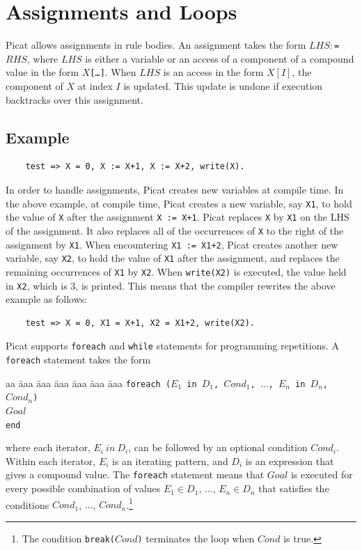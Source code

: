 \section{Assignments and Loops}
Picat allows assignments in rule bodies. An assignment takes the form $LHS $$:$\verb+=+$ RHS$, where $LHS$ is either a variable or an access of a component of a compound value in the form \texttt{$X$[\ldots]}. When $LHS$ is an access in the form $X[I]$, the component of $X$ at index $I$ is updated. This update is undone if execution backtracks over this assignment.

\subsection*{Example}
\begin{verbatim}
    test => X = 0, X := X+1, X := X+2, write(X).
\end{verbatim}

In order to handle assignments, Picat creates new variables at compile time.  In the above example, at compile time, Picat creates a new variable, say \texttt{X1}, to hold the value of \texttt{X} after the assignment \verb-X := X+1-. Picat replaces \texttt{X} by \texttt{X1} on the LHS of the assignment.  It also replaces all of the occurrences of \texttt{X} to the right of the assignment by \texttt{X1}.  When encountering \verb-X1 := X1+2-, Picat creates another new variable, say \texttt{X2}, to hold the value of \texttt{X1} after the assignment, and replaces the remaining occurrences of \texttt{X1} by \texttt{X2}. When \texttt{write(X2)} is executed, the value held in \texttt{X2}, which is 3, is printed.  This means that the compiler rewrites the above example as follows:
\begin{verbatim}
    test => X = 0, X1 = X+1, X2 = X1+2, write(X2).
\end{verbatim}

Picat supports \texttt{foreach} and \texttt{while} statements for programming repetitions. A \texttt{foreach} statement takes the form
\begin{tabbing}
aa \= aaa \= aaa \= aaa \= aaa \= aaa \= aaa \kill
\> \texttt{foreach ($E_1$ in $D_1$, $Cond_1$, $\ldots$, $E_n$ in $D_n$, $Cond_n$)}  \\
\> \> $Goal$ \\
\>  \texttt{end} 
\end{tabbing}
where each iterator, $E_i\ in\ D_i$, can be followed by an optional condition $Cond_i$.  Within each iterator, $E_i$ is an iterating pattern, and $D_i$ is an expression that gives a compound value. The \texttt{foreach} statement means that $Goal$ is executed for every possible combination of values $E_1 \in D_1$, $\ldots$, $E_n \in D_n$ that satisfies the conditions \texttt{$Cond_1$}, $\ldots$, \texttt{$Cond_n$}.\footnote{The condition \texttt{break($Cond$)} terminates the loop when $Cond$ is true.}

